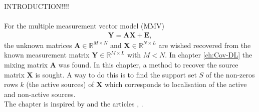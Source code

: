 INTRODUCTION!!!!
\\ \\
For the multiple measurement vector model (MMV)
\begin{align*}
\mathbf{Y} = \mathbf{AX} + \mathbf{E},
\end{align*}
the unknown matrices $\mathbf{A} \in \mathbb{R}^{M \times N}$ and $\mathbf{X} \in \mathbb{R}^{N \times L}$ are wished recovered from the known measurement matrix $\mathbf{Y} \in \mathbb{R}^{M \times L}$ with $M < N$. In chapter \ref{ch:Cov-DL} the mixing matrix $\mathbf{A}$ was found. In this chapter, a method to recover the source matrix $\mathbf{X}$ is sought. A way to do this is to find the support set $S$ of the non-zeros rows $k$ (the active sources) of $\mathbf{X}$ which corresponds to localisation of the active and non-active sources.
\\
The chapter is inspired by \cite{phd_wipf} and the articles \cite{article_wipf}, \cite{Balkan2014}.

